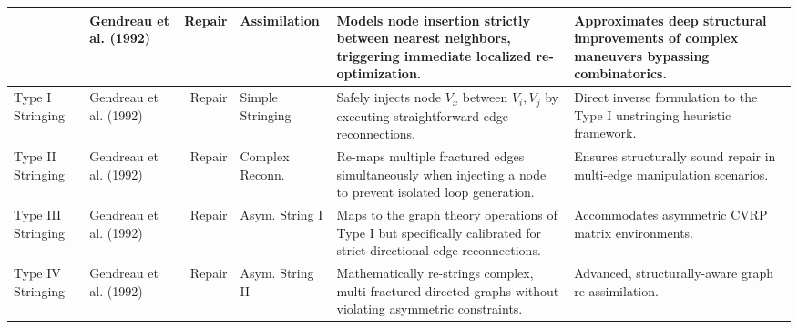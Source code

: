 \documentclass[10pt, a4paper]{article}
\begin{document}
\begin{center}
\begin{longtable}
{GENI} & Gendreau et al. (1992) & Repair & Assimilation & Models node insertion strictly between nearest neighbors, triggering immediate localized re-optimization. & Approximates deep structural improvements of complex maneuvers bypassing combinatorics. \\ \midrule
{Type I Stringing} & Gendreau et al. (1992) & Repair & Simple Stringing & Safely injects node $V_x$ between $V_i, V_j$ by executing straightforward edge reconnections. & Direct inverse formulation to the Type I unstringing heuristic framework. \\ \midrule
{Type II Stringing} & Gendreau et al. (1992) & Repair & Complex Reconn. & Re-maps multiple fractured edges simultaneously when injecting a node to prevent isolated loop generation. & Ensures structurally sound repair in multi-edge manipulation scenarios. \\ \midrule
{Type III Stringing} & Gendreau et al. (1992) & Repair & Asym. String I & Maps to the graph theory operations of Type I but specifically calibrated for strict directional edge reconnections. & Accommodates asymmetric CVRP matrix environments. \\ \midrule
{Type IV Stringing} & Gendreau et al. (1992) & Repair & Asym. String II & Mathematically re-strings complex, multi-fractured directed graphs without violating asymmetric constraints. & Advanced, structurally-aware graph re-assimilation. \\ \midrule



\end{longtable}
\end{center}
\end{document}
